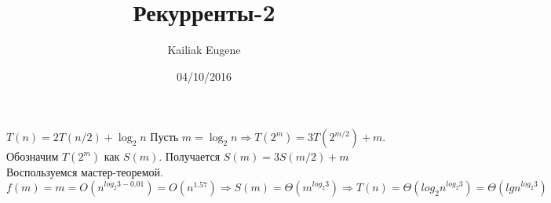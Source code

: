 \documentclass[12pt]{article}
\title{Рекурренты-2}
\date{04/10/2016}
\author{Kailiak Eugene}
\begin{document}
\maketitle
$ T(n) = 2T(n/2) + \log_2{n}$ Пусть $m = \log_2{n} \Rightarrow T(2^m) = 3T (2^{m/2}) + m $. Обозначим $T(2^m)$ как $S(m)$. Получается $ S(m) = 3S(m/2) + m$ \\
Воспользуемся мастер-теоремой. $f(m) = m = O(n^{log_2{3} - 0.01}) = O(n^{1.57}) \Rightarrow S(m) = \Theta (m^{log_2{3}})  \Rightarrow T(n) = \Theta (log_2{n}^{log_2{3}}) = \Theta (lg{n^{log_2{3}}})$\\
\end{document}
